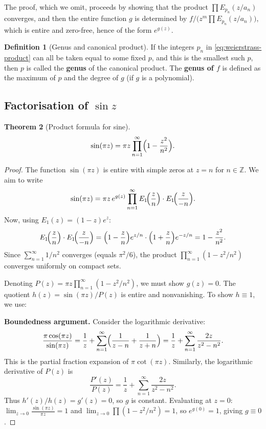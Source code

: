 \documentclass[12pt,a4paper,openany]{book}
\theoremstyle{definition}
\newtheorem{definition}{Definition}[chapter]
\theoremstyle{plain}
\newtheorem{theorem}[definition]{Theorem}
\theoremstyle{remark}
\newcommand{\Z}{\mathbb{Z}}
\begin{document}
The proof, which we omit, proceeds by showing that the product
$\prod E_{p_n}(z/a_n)$ converges, and then the entire function $g$
is determined by $f / \bigl(z^m \prod E_{p_n}(z/a_n)\bigr)$, which
is entire and zero-free, hence of the form $e^{g(z)}$.

\begin{definition}[Genus and canonical product]\label{def:genus}
If the integers $p_n$ in \eqref{eq:weierstrass-product} can all be
taken equal to some fixed $p$, and this is the smallest such $p$, then
$p$ is called the \textbf{genus} of the canonical product. The
\textbf{genus of $f$} is defined as the maximum of $p$ and the degree of
$g$ (if $g$ is a polynomial).
\end{definition}

\subsection{Factorisation of $\sin z$}

\begin{theorem}[Product formula for sine]\label{thm:sin-product}
\begin{equation}\label{eq:sin-product}
  \sin(\pi z) = \pi z \prod_{n=1}^{\infty}
  \Bigl(1 - \frac{z^2}{n^2}\Bigr).
\end{equation}
\end{theorem}

\begin{proof}
The function $\sin(\pi z)$ is entire with simple zeros at $z = n$ for
$n \in \Z$. We aim to write
\[
  \sin(\pi z) = \pi z \, e^{g(z)} \prod_{n=1}^{\infty}
  E_1\!\Bigl(\frac{z}{n}\Bigr) \cdot E_1\!\Bigl(\frac{z}{-n}\Bigr).
\]
Now, using $E_1(z) = (1-z)e^z$:
\[
  E_1\!\Bigl(\frac{z}{n}\Bigr) \cdot E_1\!\Bigl(\frac{z}{-n}\Bigr)
  = \Bigl(1 - \frac{z}{n}\Bigr)e^{z/n} \cdot
  \Bigl(1 + \frac{z}{n}\Bigr)e^{-z/n}
  = 1 - \frac{z^2}{n^2}.
\]
Since $\sum_{n=1}^{\infty} 1/n^2$ converges (equals $\pi^2/6$),
the product $\prod_{n=1}^{\infty}(1 - z^2/n^2)$ converges uniformly
on compact sets.

Denoting $P(z) = \pi z \prod_{n=1}^{\infty}(1-z^2/n^2)$, we must show
$g(z) = 0$. The quotient $h(z) = \sin(\pi z)/P(z)$ is entire and
nonvanishing. To show $h \equiv 1$, we use:

\textbf{Boundedness argument.} Consider the logarithmic derivative:
\[
  \frac{\pi\cos(\pi z)}{\sin(\pi z)}
  = \frac{1}{z} + \sum_{n=1}^{\infty}\Bigl(\frac{1}{z-n}+\frac{1}{z+n}\Bigr)
  = \frac{1}{z} + \sum_{n=1}^{\infty}\frac{2z}{z^2-n^2}.
\]
This is the partial fraction expansion of $\pi\cot(\pi z)$.
Similarly, the logarithmic derivative of $P(z)$ is
\[
  \frac{P'(z)}{P(z)} = \frac{1}{z} + \sum_{n=1}^{\infty}\frac{2z}{z^2-n^2}.
\]
Thus $h'(z)/h(z) = g'(z) = 0$, so $g$ is constant.
Evaluating at $z=0$:
$\lim_{z\to 0}\frac{\sin(\pi z)}{\pi z} = 1$ and
$\lim_{z\to 0} \prod(1-z^2/n^2) = 1$, so $e^{g(0)} = 1$,
giving $g \equiv 0$.
\end{proof}
\end{document}
